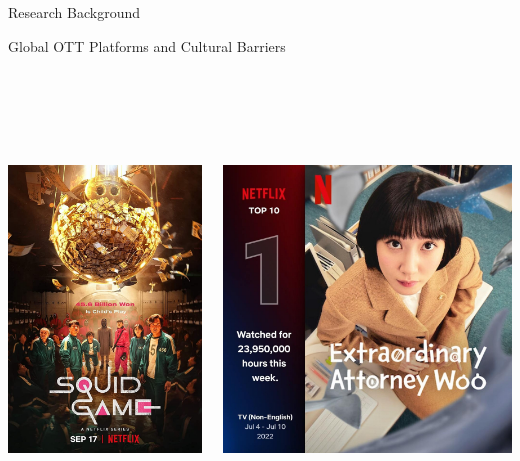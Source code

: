 \documentclass[
  ignorenonframetext,
]{beamer}
\begin{document}
\begin{frame}[fragile]{Research Background}
\begin{block}{Global OTT Platforms and Cultural Barriers}
\begin{columns}[T]
\begin{column}{0.25\textwidth}
\includegraphics[width=\textwidth,height=4.6875in]{img/ott_1.jpg}
\end{column}

\begin{column}{0.25\textwidth}
\includegraphics[width=\textwidth,height=4.6875in]{img/ott_2.jpg}
\end{column}
\end{columns}
\end{block}
\end{frame}
\end{document}
